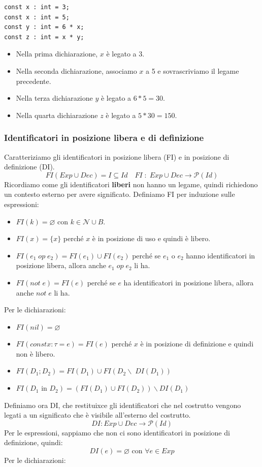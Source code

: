 \documentclass[a4paper]{article}
\begin{document}
\begin{Example}{}{}
\begin{lstlisting}
const x : int = 3;
const x : int = 5;
const y : int = 6 * x;
const z : int = x * y;
\end{lstlisting}

\begin{itemize}
  \item Nella prima dichiarazione, $x$ è legato a 3.
  \item Nella seconda dichiarazione, associamo $x$ a 5 e sovrascriviamo il legame precedente.
  \item Nella terza dichiarazione $y$ è legato a $6 * 5 = 30$.
  \item Nella quarta dichiarazione $z$ è legato a $5 * 30 = 150$.
\end{itemize}

\end{Example}

\subsubsection{Identificatori in posizione libera e di definizione}
Caratteriziamo gli identificatori in posizione libera (FI) e in posizione 
di definizione (DI). 
\[
  FI(Exp \cup Dec) = I \subseteq Id \quad FI \; : \; Exp \cup Dec \to \mathcal{P}(Id)
\]
Ricordiamo come gli identificatori \textbf{liberi} non hanno un legame, quindi 
richiedono un contesto esterno per avere significato.
Definiamo FI per induzione sulle espressioni:
\begin{itemize}
  \item $FI(k) = \varnothing$ con $k \in \mathcal{N} \cup B$.
  \item $FI(x) = \{x\}$ perché $x$ è in posizione di uso e quindi è libero.
  \item $FI(e_1 \; op \; e_2) = FI(e_1) \cup FI(e_2)$ perché se $e_1$ o $e_2$ hanno identificatori in posizione libera, allora anche $e_1 \; op \; e_2$ li ha.
  \item $FI(not \; e) = FI(e)$ perché se $e$ ha identificatori in posizione libera, allora anche $not \; e$ li ha.
\end{itemize}
Per le dichiarazioni:
\begin{itemize}
  \item $FI(nil) = \varnothing$ 
  \item $FI(const x : \tau = e) = FI(e)$ perché $x$ è in posizione 
  di definizione e quindi non è libero.
  \item $FI(D_1 ; D_2) = FI(D_1) \cup FI(D_2 \backslash \; DI(D_1))$ 
  \item $FI(D_1 \text{ in } D_2) = (FI(D_1) \cup FI(D_2)) \backslash DI(D_1)$ 
\end{itemize}
\noindent
Definiamo ora DI, che restituixce gli identificatori che nel costrutto vengono 
legati a un significato che è visibile all'esterno del costrutto.
\[
  DI : Exp \cup Dec \to \mathcal{P}(Id)
\]
Per le espressioni, sappiamo che non ci sono identificatori in posizione di definizione, quindi:
\[
  DI(e) = \varnothing \text{ con } \forall e \in Exp
\]
Per le dichiarazioni:
\end{document}

